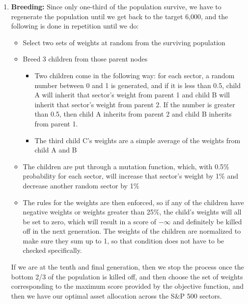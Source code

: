 \documentclass[]{article}
\providecommand{\tightlist}{%
  \setlength{\itemsep}{2pt}\setlength{\parskip}{0pt}}
\begin{document}
\begin{enumerate}
\def\labelenumi{\arabic{enumi}.}
\setcounter{enumi}{3}
\tightlist
\item
  \textbf{Breeding:} Since only one-third of the population survive, we
  have to regenerate the population until we get back to the target
  6,000, and the following is done in repetition until we do:

  \begin{itemize}
  \tightlist
  \item
    Select two sets of weights at random from the surviving population
  \item
    Breed 3 children from those parent nodes

    \begin{itemize}
    \tightlist
    \item
      Two children come in the following way: for each sector, a random
      number between 0 and 1 is generated, and if it is less than 0.5,
      child A will inherit that sector's weight from parent 1 and child
      B will inherit that sector's weight from parent 2. If the number
      is greater than 0.5, then child A inherits from parent 2 and child
      B inherits from parent 1.
    \item
      The third child C's weights are a simple average of the weights
      from child A and B
    \end{itemize}
  \item
    The children are put through a mutation function, which, with 0.5\%
    probability for each sector, will increase that sector's weight by
    1\% and decrease another random sector by 1\%
  \item
    The rules for the weights are then enforced, so if any of the
    children have negative weights or weights greater than 25\%, the
    child's weights will all be set to zero, which will result in a
    score of \(-\infty\) and definitely be killed off in the next
    generation. The weights of the children are normalized to make sure
    they sum up to 1, so that condition does not have to be checked
    specifically.
  \end{itemize}

  If we are at the tenth and final generation, then we stop the process
  once the bottom 2/3 of the population is killed off, and then choose
  the set of weights corresponding to the maximum score provided by the
  objective function, and then we have our optimal asset allocation
  across the S\&P 500 sectors.
\end{enumerate}
\end{document}
